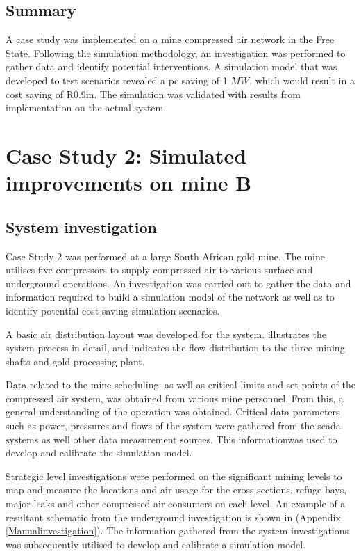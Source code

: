 \subsection{Summary}
A case study was implemented on a mine compressed air network in the Free State. Following the simulation methodology, an investigation was performed to gather data and identify potential interventions. A simulation model that was developed to test scenarios revealed a \gls{pc} saving of 1 $MW$, which would result in a cost saving of R0.9m. The simulation was validated with results from implementation on the actual system.
\section{Case Study 2: Simulated improvements on mine B}
	\subsection{System investigation}
	Case Study 2 was performed at a large South African gold mine. The mine utilises five compressors to supply compressed air to various surface and underground operations. An investigation was carried out to gather the data and information required to build a simulation model of the network as well as to identify potential cost-saving simulation scenarios.
	\par 
	A basic air distribution layout was developed for the system.  illustrates the system process in detail, and indicates the flow distribution to the three mining shafts and gold-processing plant.
	\par 
	Data related to the mine scheduling, as well as critical limits and  set-points of the compressed air system, was obtained from various mine personnel. From this, a general understanding of the operation was obtained.  Critical data parameters such as power, pressures and flows of the system were gathered from the \acrfull{scada} systems as well other data measurement sources. This informationwas used to develop and calibrate the simulation model.
	\par 
	Strategic level investigations were performed on the significant mining levels to map and measure the locations and air usage for the cross-sections, refuge bays, major leaks and other compressed air consumers on each level. An example of a resultant schematic from the underground investigation is shown in  (Appendix \ref{Manualinvestigation}). The information gathered from the system investigations was subsequently utilised to develop and calibrate a simulation model.
